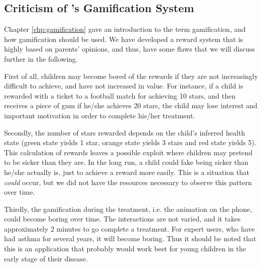 \subsection{Criticism of \app{}'s Gamification System}
Chapter \ref{chp:gamification} gave an introduction to the term gamification, and how gamification should be used. We have developed a reward system that is highly based on parents' opinions, and thus, have some flaws that we will discuss further in the following. 

First of all, children may become bored of the rewards if they are not increasingly difficult to achieve, and have not increased in value. For instance, if a child is rewarded with a ticket to a football match for achieving 10 stars, and then receives a piece of gum if he/she achieves 20 stars, the child may lose interest and important motivation in order to complete his/her treatment. 

Secondly, the number of stars rewarded depends on the child's inferred health state (green state yields 1 star, orange state yields 3 stars and red state yields 5). This calculation of rewards leaves a possible exploit where children may pretend to be sicker than they are. In the long run, a child could fake being sicker than he/she actually is, just to achieve a reward more easily. This is a situation that \emph{could} occur, but we did not have the resources necessary to observe this pattern over time.

Thirdly, the gamification during the treatment, i.e. the animation on the phone, could become boring over time. 
The interactions are not varied, and it takes approximately 2 minutes to go complete a treatment. For expert users, who have had asthma for several years, it will become boring. Thus it should be noted that this is an application that probably would work best for young children in the early stage of their disease.  
